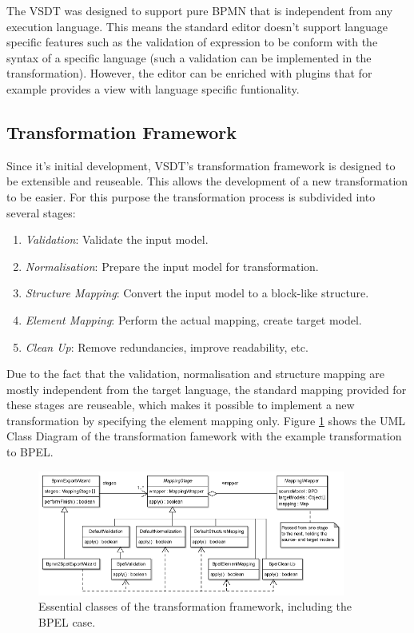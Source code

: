 The VSDT was designed to support pure BPMN that is independent from any execution language\cite{TKAH08}. This means the standard editor doesn't support language specific features such as the validation of expression to be conform with the syntax of a specific language (such a validation can be implemented in the transformation). However, the editor can be enriched with plugins that for example provides a view with language specific funtionality.  


\subsection{Transformation Framework}
Since it's initial development, VSDT's transformation framework is designed to be extensible and reuseable. This allows the development of a new transformation to be easier. For this purpose the transformation process is subdivided into several stages: 
\begin{enumerate}
	\item \textit{Validation}: Validate the input model.
	\item \textit{Normalisation}: Prepare the input model for transformation.
	\item \textit{Structure Mapping}: Convert the input model to a block-like structure.
	\item \textit{Element Mapping}: Perform the actual mapping, create target model.
	\item \textit{Clean Up}: Remove redundancies, improve readability, etc.
\end{enumerate}

Due to the fact that the validation, normalisation and structure mapping are mostly independent from the target language, the standard mapping provided for these stages are reuseable, which makes it possible to implement a new transformation by specifying the element mapping only. Figure \ref{fig:transform} shows the UML Class Diagram of the transformation famework with the example transformation to BPEL.
\begin{figure}[h]
	\centering
		\includegraphics[width=0.90\textwidth]{images/transformation.png}
	\caption{Essential classes of the transformation framework, including the BPEL case.\cite{TK07}}
	\label{fig:transform}
\end{figure}

